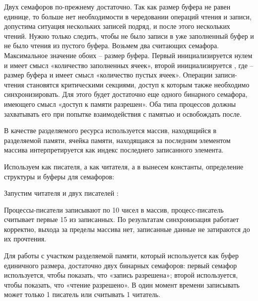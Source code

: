 Двух семафоров по-прежнему достаточно. Так как размер буфера не равен единице, то больше нет необходимости в чередовании операций чтения и записи, допустима ситуация нескольких записей подряд, и после этого нескольких чтений. Нужно только следить, чтобы не было записи в уже заполненный буфер и не было чтения из пустого буфера. Возьмем два считающих семафора. Максимальное значение обоих -- размер буфера. Первый инициализируется нулем и имеет смысл «количество заполненных ячеек», второй инициализируется , где  -- размер буфера и имеет смысл «количество пустых ячеек». Операции записи-чтения становятся критическими секциями, доступ к которым также необходимо синхронизировать. Для этого будет достаточно еще одного бинарного семафора, имеющего смысл «доступ к памяти разрешен». Оба типа процессов должны захватывать его при попытке взаимодействия с памятью и освобождать после.

В качестве разделяемого ресурса используется массив, находящийся в разделяемой памяти, ячейка памяти, находящаяся за последним элементом массива интерпретируется как индекс последнего записанного элемента.

Используем  как писателя, а  как читателя, а в  вынесем константы, определение структуры  и буферы для семафоров:




Запустим читателя  и двух писателей :




Процессы-писатели записывают по 10 чисел в массив, процесс-писатель считывает первые 15 из записанных. По результатам синхронизация работает корректно, выхода за пределы массива нет, записанные данные не затираются до их прочтения.

Для работы с участком разделяемой памяти, который используется как буфер единичного размера, достаточно двух бинарных семафоров: первый семафор используется, чтобы показать, что «запись разрешена»; второй используется, чтобы показать, что «чтение разрешено». В один момент времени записывать может только 1 писатель или считывать 1 читатель.

